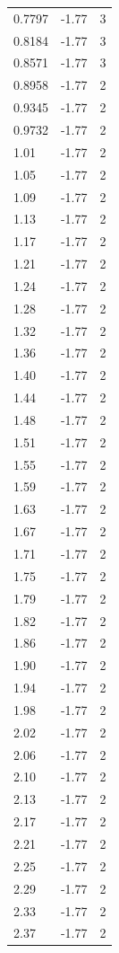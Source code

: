 \begin{longtable}{lrr}
  0.7797 & -1.77 & 3 \\
  0.8184 & -1.77 & 3 \\
  0.8571 & -1.77 & 3 \\
  0.8958 & -1.77 & 2 \\
  0.9345 & -1.77 & 2 \\
  0.9732 & -1.77 & 2 \\
  1.01 & -1.77 & 2 \\
  1.05 & -1.77 & 2 \\
  1.09 & -1.77 & 2 \\
  1.13 & -1.77 & 2 \\
  1.17 & -1.77 & 2 \\
  1.21 & -1.77 & 2 \\
  1.24 & -1.77 & 2 \\
  1.28 & -1.77 & 2 \\
  1.32 & -1.77 & 2 \\
  1.36 & -1.77 & 2 \\
  1.40 & -1.77 & 2 \\
  1.44 & -1.77 & 2 \\
  1.48 & -1.77 & 2 \\
  1.51 & -1.77 & 2 \\
  1.55 & -1.77 & 2 \\
  1.59 & -1.77 & 2 \\
  1.63 & -1.77 & 2 \\
  1.67 & -1.77 & 2 \\
  1.71 & -1.77 & 2 \\
  1.75 & -1.77 & 2 \\
  1.79 & -1.77 & 2 \\
  1.82 & -1.77 & 2 \\
  1.86 & -1.77 & 2 \\
  1.90 & -1.77 & 2 \\
  1.94 & -1.77 & 2 \\
  1.98 & -1.77 & 2 \\
  2.02 & -1.77 & 2 \\
  2.06 & -1.77 & 2 \\
  2.10 & -1.77 & 2 \\
  2.13 & -1.77 & 2 \\
  2.17 & -1.77 & 2 \\
  2.21 & -1.77 & 2 \\
  2.25 & -1.77 & 2 \\
  2.29 & -1.77 & 2 \\
  2.33 & -1.77 & 2 \\
  2.37 & -1.77 & 2 \\

\end{longtable}
